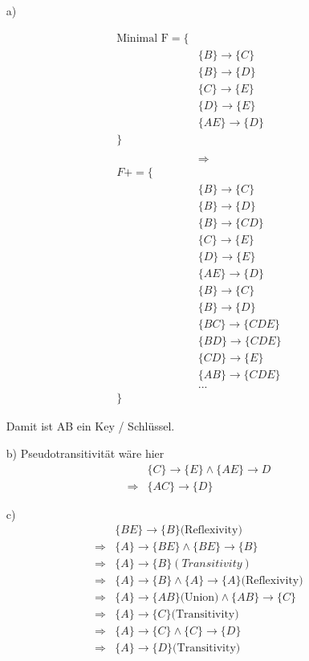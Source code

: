 \begin{enumerate}

\item[a)]

\begin{align*}
\text{Minimal F} = \{ & \\
& \{B\} \rightarrow \{C\} \\
& \{B\} \rightarrow \{D\} \\
& \{C\} \rightarrow \{E\} \\
& \{D\} \rightarrow \{E\} \\
& \{AE\} \rightarrow \{D\} \\
\} & \\ \\
& \Rightarrow \\
F+ = \{ & \\
& \{B\} \rightarrow \{C\} \\
& \{B\} \rightarrow \{D\} \\
& \{B\} \rightarrow \{CD\} \\
& \{C\} \rightarrow \{E\} \\
& \{D\} \rightarrow \{E\} \\
& \{AE\} \rightarrow \{D\} \\
& \{B\} \rightarrow \{C\} \\
& \{B\} \rightarrow \{D\} \\
& \{BC\} \rightarrow \{CDE\} \\
& \{BD\} \rightarrow \{CDE\} \\
& \{CD\} \rightarrow \{E\} \\
& \{AB\} \rightarrow \{CDE\} \\
& ... \\
\} &
\end{align*}

Damit ist AB ein Key / Schlüssel.

\item[b)]
Pseudotransitivität wäre hier
\begin{align*}
& \{C\} \rightarrow \{E\} \land \{AE\} \rightarrow D \\
\Rightarrow & \{AC\} \rightarrow \{D\}
\end{align*}

\item[c)]
\begin{align*}
& \{BE\} \rightarrow \{B\} \text{(Reflexivity)} \\
\Rightarrow & \{A\} \rightarrow \{BE\} \land \{BE\} \rightarrow \{B\} \\
\Rightarrow & \{A\} \rightarrow \{B\} (Transitivity) \\
\Rightarrow & \{A\} \rightarrow \{B\} \land \{A\} \rightarrow \{A\} \text{(Reflexivity)} \\
\Rightarrow & \{A\} \rightarrow \{AB\} \text{(Union)} \land \{AB\} \rightarrow \{C\} \\
\Rightarrow & \{A\} \rightarrow \{C\} \text{(Transitivity)} \\
\Rightarrow & \{A\} \rightarrow \{C\} \land \{C\} \rightarrow \{D\} \\
\Rightarrow & \{A\} \rightarrow \{D\} \text{(Transitivity)}
\end{align*}


\end{enumerate}
